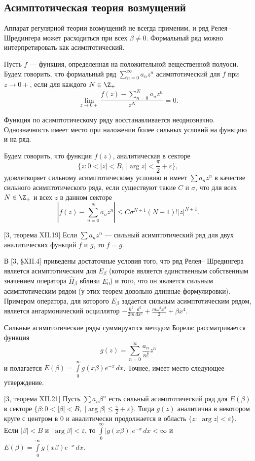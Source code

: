 \documentclass[a4paper
]{article}
\begin{document}
\subsection{Асимптотическая теория возмущений}
Аппарат регулярной теории возмущений не всегда применим, и ряд
Релея--Шредингера может расходиться при всех $\beta\ne 0$. Формальный ряд
можно интерпретировать как асимптотический.
\begin{Def}
Пусть $f$ --- функция, определенная на положительной вещественной
полуоси. Будем говорить, что формальный ряд $\sum \limits_{n=0}^\infty
a_nz^n$ асимптотический для $f$ при $z\rightarrow 0+$, если для каждого
$N\in \Z_+$ $$\lim \limits_{z\rightarrow 0+}\frac{f(z)-\sum \limits
_{n=0}^N a_nz^n}{z^N}=0.$$
\end{Def}
Функция по асимптотическому ряду восстанавливается неоднозначно.
Однозначность имеет место при наложении более сильных условий на функцию
и на ряд.
\begin{Def}
Будем говорить, что функция $f(z)$, аналитическая в секторе $$\{z:
0<|z|<B, \, |\arg z|<\frac{\pi}{2}+\varepsilon\},$$ удовлетворяет
сильному асимптотическому условию и имеет $\sum a_nz^n$ в качестве сильного
асимптотического ряда, если существуют такие $C$ и $\sigma$, что для всех
$N\in \Z_+$ и всех $z$ в данном секторе $$\left|f(z)-\sum \limits_{n=0}^N
a_nz^n\right|\le C\sigma^{N+1}(N+1)!|z|^{N+1}.$$
\end{Def}
\begin{Trm}
{\rm [3, теорема XII.19]}
Если $\sum a_nz^n$ --- сильный асимптотический ряд для двух аналитических
функций $f$ и $g$, то $f=g$.
\end{Trm}
В [3, \S XII.4] приведены достаточные условия того, что ряд Релея--
Шредингера является асимптотическим для $E_\beta$ (которое является
единственным собственным значением оператора $\hat H_\beta$ вблизи
$E_0$) и того, что он является сильным асимптотическим рядом (у этих
теорем довольно длинные формулировки). Примером оператора, для которого
$E_\beta$ задается сильным асимптотическим рядом, является ангармонический
осциллятор $-\frac{\hbar^2}{2m}\frac{d^2}{dx^2}+\frac{m\omega^2x^2}{2}+
\beta x^4$. \par
Сильные асимптотические ряды суммируются методом Бореля: рассматривается
функция $$g(z)=\sum \limits_{n=0}^\infty \frac{a_n}{n!}z^n$$ и полагается
$E(\beta)=\int \limits_0^\infty g(x\beta)e^{-x}\, dx$. Точнее, имеет
место следующее утверждение.
\begin{Trm}
{\rm [3, теорема XII.21]}
Пусть $\sum a_n\beta^n$ есть сильный асимптотический ряд для $E(\beta)$
в секторе $\{\beta:0<|\beta|<B, \; |\arg \beta|\le \frac{\pi}{2}+
\varepsilon\}$. Тогда $g(z)$ аналитична в некотором круге с центром в 0
и аналитически продолжается в область $\{z:|\arg z|<\varepsilon\}$. Если
$|\beta|<B$ и $|\arg \beta|<\varepsilon$, то $\int \limits_0^\infty
|g(x\beta)|e^{-x}\, dx<\infty$ и $E(\beta)=\int \limits_0^\infty
g(x\beta)e^{-x}\, dx$.
\end{Trm}
\end{document}
